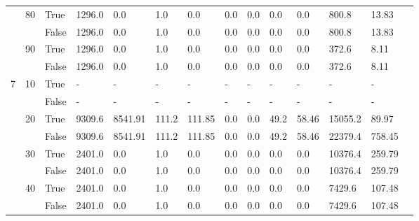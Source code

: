 \begin{appendices}
\begin{landscape}
\begin{small}
\begin{longtable}[c]{@{}lll|ll|ll|ll|ll|lll@{}}
   & 80 & True  & 1296.0          & 0.0            & 1.0           & 0.0           & 0.0           & 0.0           & 0.0           & 0.0           & 800.8         & 13.83       &  \\
   &    & False & 1296.0          & 0.0            & 1.0           & 0.0           & 0.0           & 0.0           & 0.0           & 0.0           & 800.8         & 13.83       &  \\
   & 90 & True  & 1296.0          & 0.0            & 1.0           & 0.0           & 0.0           & 0.0           & 0.0           & 0.0           & 372.6         & 8.11        &  \\
   &    & False & 1296.0          & 0.0            & 1.0           & 0.0           & 0.0           & 0.0           & 0.0           & 0.0           & 372.6         & 8.11        &  \\
  \midrule
7  & 10 & True  & -               & -              & -             & -             & -             & -             & -             & -             & -             & -           &  \\
   &    & False & -               & -              & -             & -             & -             & -             & -             & -             & -             & -           &  \\
   & 20 & True  & 9309.6          & 8541.91        & 111.2         & 111.85        & 0.0           & 0.0           & 49.2          & 58.46         & 15055.2       & 89.97       &  \\
   &    & False & 9309.6          & 8541.91        & 111.2         & 111.85        & 0.0           & 0.0           & 49.2          & 58.46         & 22379.4       & 758.45      &  \\
   & 30 & True  & 2401.0          & 0.0            & 1.0           & 0.0           & 0.0           & 0.0           & 0.0           & 0.0           & 10376.4       & 259.79      &  \\
   &    & False & 2401.0          & 0.0            & 1.0           & 0.0           & 0.0           & 0.0           & 0.0           & 0.0           & 10376.4       & 259.79      &  \\
   & 40 & True  & 2401.0          & 0.0            & 1.0           & 0.0           & 0.0           & 0.0           & 0.0           & 0.0           & 7429.6        & 107.48      &  \\
   &    & False & 2401.0          & 0.0            & 1.0           & 0.0           & 0.0           & 0.0           & 0.0           & 0.0           & 7429.6        & 107.48      &  \\

\end{longtable}
\end{small}
\end{landscape}
\end{appendices}
